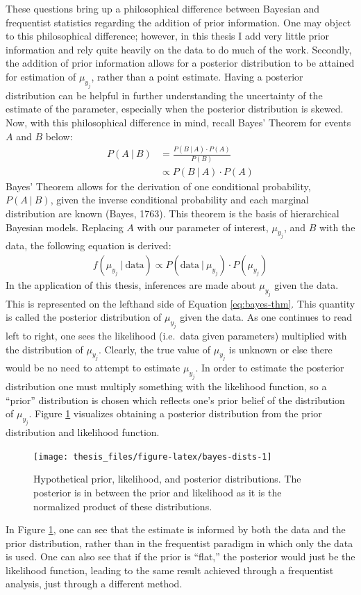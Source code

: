 \documentclass[12pt,twoside]{reedthesis}
\begin{document}
These questions bring up a philosophical difference between Bayesian and frequentist statistics regarding the addition of prior information. One may object to this philosophical difference; however, in this thesis I add very little prior information and rely quite heavily on the data to do much of the work. Secondly, the addition of prior information allows for a posterior distribution to be attained for estimation of \(\mu_{y_j}\), rather than a point estimate. Having a posterior distribution can be helpful in further understanding the uncertainty of the estimate of the parameter, especially when the posterior distribution is skewed. Now, with this philosophical difference in mind, recall Bayes' Theorem for events \(A\) and \(B\) below:
\begin{align}
P(A ~\vert~ B) &= \frac{P(B ~\vert~ A) \cdot P(A)}{P(B)} \nonumber \\
&\propto P(B ~\vert~ A) \cdot P(A)
\end{align}
Bayes' Theorem allows for the derivation of one conditional probability, \(P(A ~\vert~ B)\), given the inverse conditional probability and each marginal distribution are known (Bayes, 1763). This theorem is the basis of hierarchical Bayesian models. Replacing \(A\) with our parameter of interest, \(\mu_{y_j}\), and \(B\) with the data, the following equation is derived:
\begin{align}
f(\mu_{y_j} ~\vert~ \text{data}) \propto P(\text{data} ~\vert~ \mu_{y_j}) \cdot P(\mu_{y_j})
\label{eq:bayes-thm}
\end{align}
In the application of this thesis, inferences are made about \(\mu_{y_j}\) given the data. This is represented on the lefthand side of Equation \eqref{eq:bayes-thm}. This quantity is called the posterior distribution of \(\mu_{y_j}\) given the data. As one continues to read left to right, one sees the likelihood (i.e.~data given parameters) multiplied with the distribution of \(\mu_{y_j}\). Clearly, the true value of \(\mu_{y_j}\) is unknown or else there would be no need to attempt to estimate \(\mu_{y_j}\). In order to estimate the posterior distribution one must multiply something with the likelihood function, so a ``prior'' distribution is chosen which reflects one's prior belief of the distribution of \(\mu_{y_j}\). Figure \ref{fig:bayes-dists} visualizes obtaining a posterior distribution from the prior distribution and likelihood function.
\begin{figure}
\texttt{[image: thesis\_files/figure-latex/bayes-dists-1]} \caption[Prior, likelihood, and posterior distributions.]{Hypothetical prior, likelihood, and posterior distributions. The posterior is in between the prior and likelihood as it is the normalized product of these distributions.}\label{fig:bayes-dists}
\end{figure}
In Figure \ref{fig:bayes-dists}, one can see that the estimate is informed by both the data and the prior distribution, rather than in the frequentist paradigm in which only the data is used. One can also see that if the prior is ``flat,'' the posterior would just be the likelihood function, leading to the same result achieved through a frequentist analysis, just through a different method.
\end{document}
